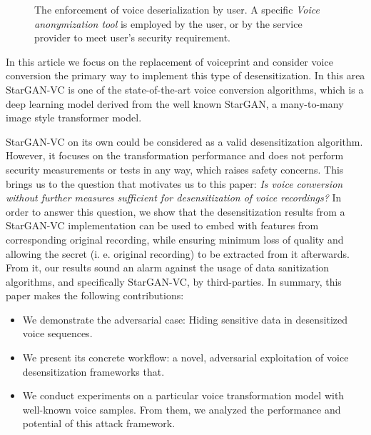 \documentclass[conference]{IEEEtran}
\begin{document}
\begin{figure}[!t]
    \caption{The enforcement of voice deserialization by user. A specific \textit{Voice anonymization tool} is employed by the user, or by the service provider to meet user's security requirement.}
    \label{fig:privacy_enforcement}
\end{figure}

In this article we focus on the replacement of voiceprint and consider voice conversion the primary way to implement this type of desensitization. In this area StarGAN-VC is one of the state-of-the-art voice conversion algorithms, which is a deep learning model derived from the well known StarGAN, a many-to-many image style transformer model.

StarGAN-VC on its own could be considered as a valid desensitization algorithm. However, it focuses on the transformation performance and does not perform security measurements or tests in any way, which raises safety concerns. This brings us to the question that motivates us to this paper: \textit{Is voice conversion without further measures sufficient for desensitization of voice recordings?} In order to answer this question, we show that the desensitization results from a StarGAN-VC implementation can be used to embed with features from corresponding original recording, while ensuring minimum loss of quality and allowing the secret (i. e. original recording) to be extracted from it afterwards. From it, our results sound an alarm against the usage of data sanitization algorithms, and specifically StarGAN-VC, by third-parties. In summary, this paper makes the following contributions:

\begin{itemize}

\item We demonstrate the adversarial case: Hiding sensitive data in desensitized voice sequences.

\item We present its concrete workflow: a novel, adversarial exploitation of voice desensitization frameworks that.

\item We conduct experiments on a particular voice transformation model with well-known voice samples. From them, we analyzed the performance and potential of this attack framework.

\end{itemize}
\end{document}
